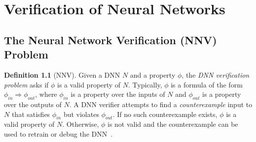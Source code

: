 \documentclass[oneside,11pt,dvipsnames]{book}
\numberwithin{equation}{section}
\theoremstyle{definition}
\newtheorem{definition}{Definition}[section]
\theoremstyle{remark}
\begin{document}









\chapter{Verification of Neural Networks}\label{sec:verification}


\section{The Neural Network Verification (NNV) Problem}\label{sec:nnv-problem}

\begin{definition}[NNV]
Given a DNN \(N\) and a property $\phi$, the \emph{DNN verification problem} asks if $\phi$ is a valid property of $N$.
Typically, $\phi$ is a formula of the form $\phi_{in} \Rightarrow \phi_{out}$, where $\phi_{in}$ is a property over the inputs of $N$ and $\phi_{out}$ is a property over the outputs of $N$.
A DNN verifier attempts to find a \emph{counterexample} input to $N$ that satisfies $\phi_{in}$ but violates $\phi_{out}$.  If no such counterexample exists, $\phi$ is a valid property of $N$. Otherwise, $\phi$ is not valid and the counterexample can be used to retrain or debug the DNN~\cite{huang2017safety}.
\end{definition}
\end{document}
